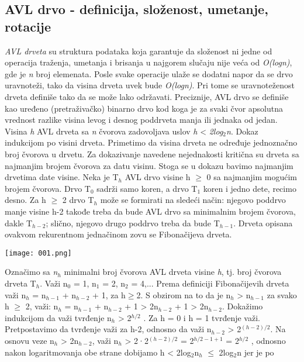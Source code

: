 \documentclass{article}
\begin{document}
\subsection{AVL drvo - definicija, složenost, umetanje, rotacije}
\textit{AVL drveta} su struktura podataka koja garantuje da složenost ni jedne od operacija traženja, umetanja i brisanja u najgorem slučaju nije veća od \textit{O(logn)},
gde je \textit{n} broj elemenata. Posle svake operacije ulaže se dodatni napor da se drvo
uravnoteži, tako da visina drveta uvek bude \textit{O(logn)}. Pri tome se uravnoteženost
drveta definiše tako da se može lako održavati. Preciznije, AVL drvo se definiše
kao uređeno (pretraživačko) binarno drvo kod koga je za svaki čvor apsolutna
vrednost razlike visina levog i desnog poddrveta manja ili jednaka od jedan. 
\vspace{0.1cm}\newline Visina \textit{h} AVL drveta sa \textit{n} čvorova zadovoljava uslov \textit{h} < \textit{2log$_2$n}. Dokaz indukcijom po visini drveta. Primetimo da visina drveta
ne određuje jednoznačno broj čvorova u drvetu. Za dokazivanje navedene
nejednakosti kritična su drveta sa najmanjim brojem čvorova za datu visinu. Stoga se u dokazu bavimo najmanjim drvetima date
visine. Neka je T$_h$ AVL drvo visine h $\geq$ 0 sa najmanjim mogućim brojem
čvorova. Drvo T$_0$ sadrži samo koren, a drvo T$_1$ koren i jedno dete, recimo desno. Za h $\geq$ 2 drvo T$_h$ može se formirati na sledeći način: njegovo poddrvo manje
visine h-2 takođe treba da bude AVL drvo sa minimalnim brojem čvorova,
dakle T$_{h-2}$; slično, njegovo drugo poddrvo treba da bude T$_{h-1}$. Drveta opisana
ovakvom rekurentnom jednačinom zovu se Fibonačijeva drveta.
\begin{center}
   \texttt{[image: 001.png]} 
\end{center}
Označimo sa \textit{n$_h$} minimalni broj čvorova AVL drveta visine \textit{h}, tj. broj čvorova
drveta T$_h$. Važi n$_0$ = 1, n$_1$ = 2, n$_2$ = 4,... Prema definiciji Fibonačijevih drveta važi n$_h$ = n$_{h-1}$ + n$_{h-2}$ + 1, za h$\geq$2. S obzirom na to da je n$_h$ > n$_{h-1}$ za svako h $\geq$ 2, važi: n$_h$ = n$_{h-1}$ + n$_{h-2}$ + 1 > 2n$_{h-2}$ + 1 > 2n$_{h-2}$.
\newline 
Dokažimo indukcijom da važi tvrđenje n$_h$ > 2$^{h/2}$ . Za h = 0 i h = 1 tvrđenje
važi. Pretpostavimo da tvrđenje važi za h-2, odnosno da važi n$_{h-2}$ > 2$^{(h-2)/2}$.
Na osnovu veze n$_h$ > 2n$_{h-2}$, važi n$_h$ > 2·2$^{(h-2)/2}$ = 2$^{h/2-1+1}$ = 2$^{h/2}$ , odnosno
nakon logaritmovanja obe strane dobijamo h < 2log$_2$n$_h$ $\leq$ 2log$_2$n jer je po
\end{document}
